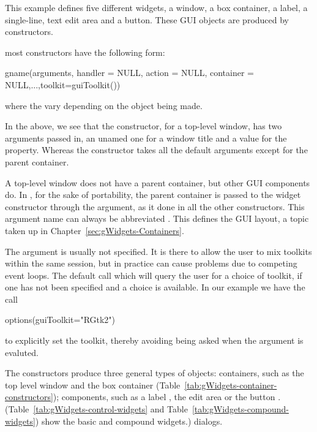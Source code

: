 This example defines five different widgets, a window, a box
container, a label, a single-line, text edit area and a button. These
GUI objects are produced by constructors.


 most constructors have the following form: 
\begin{Schunk}
\begin{Sinput}
 gname(arguments, handler = NULL, action = NULL, 
       container = NULL,...,toolkit=guiToolkit())
\end{Sinput}
\end{Schunk}
where the  vary depending on the object being made. 

In the above, we see that the  constructor, for a
top-level window, has two arguments passed in, an unamed one for a
window title and a value for the  property. Whereas the
 constructor takes all the default arguments except for
the parent container.

A top-level window does not have a parent container, but other GUI
components do. In , for the sake of portability, the
parent container is passed to the widget constructor through the
 argument, as it done in all the other constructors.
This argument name can always be abbreviated . This defines
the GUI layout, a topic taken up in
Chapter~\ref{sec:gWidgets-Containers}.

The  argument is usually not specified. It is there to
allow the user to mix toolkits within the same \R\/ session, but in
practice can cause problems due to competing event loops. The default
call  which will query the user for a choice of
toolkit, if one has not been specified and a choice is available. In
our example we have the call
\begin{Schunk}
\begin{Sinput}
 options(guiToolkit="RGtk2")
\end{Sinput}
\end{Schunk}
to explicitly set the toolkit, thereby avoiding being asked when the
 argument is evaluted.



The constructors produce three general types of objects: containers,
such as the top level window  and the box container 
(Table~\ref{tab:gWidgets-container-constructors}); components, such as
a label , the edit area  or the button .
(Table~\ref{tab:gWidgets-control-widgets} and
Table~\ref{tab:gWidgets-compound-widgets}) show the basic and compound
widgets.)  dialogs.



